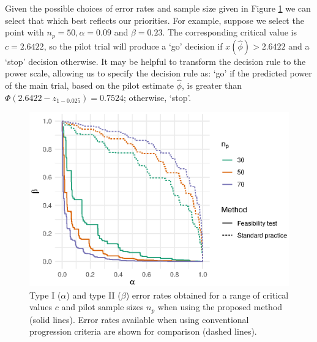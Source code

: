 \documentclass{article}
\begin{document}
Given the possible choices of error rates and sample size given in Figure \ref{fig:ex_ocs} we can select that which best reflects our priorities. For example, suppose we select the point with $n_p = 50, \alpha = 0.09$ and $\beta = 0.23$. The corresponding critical value is $c = 2.6422$, so the pilot trial will produce a `go' decision if $x(\hat{\phi}) > 2.6422$ and a `stop' decision otherwise. It may be helpful to transform the decision rule to the power scale, allowing us to specify the decision rule as: `go' if the predicted power of the main trial, based on the pilot estimate $\hat{\phi}$, is greater than $\Phi(2.6422 - z_{1-0.025}) = 0.7524$; otherwise, `stop'.

\begin{figure}
\centering
\includegraphics[scale=0.8]{ex_ocs}
\caption{Type I ($\alpha$) and type II ($\beta$) error rates obtained for a range of critical values $c$ and pilot sample sizes $n_p$ when using the proposed method (solid lines). Error rates available when using conventional progression criteria are shown for comparison (dashed lines).}
\label{fig:ex_ocs}
\end{figure}
\end{document}
